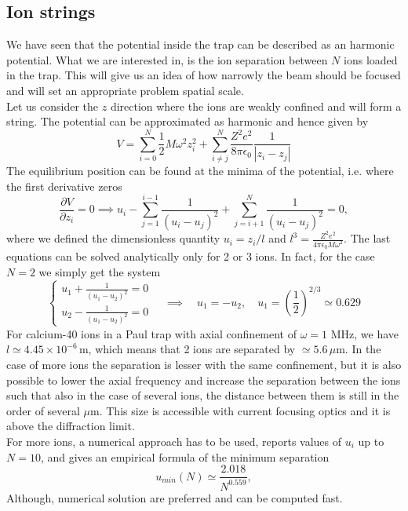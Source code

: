 \subsection{Ion strings}
We have seen that the potential inside the trap can be described as an harmonic potential. What we are interested in, is the ion separation between $N$ ions loaded in the trap. This will give us an idea of how narrowly the beam should be focused and will set an appropriate problem spatial scale.\\
Let us consider the $z$ direction where the ions are weakly confined and will form a string. The potential can be approximated as harmonic and hence given by
\begin{equation}
V = \sum_{i=0}^N \frac{1}{2}M\omega^2z_i^2 + \sum_{i\neq j}^N\frac{Z^2e^2}{8\pi \epsilon_0}\frac{1}{|z_i-z_j|}
\end{equation}
The equilibrium position can be found at the minima of the potential, i.e. where the first derivative zeros
\begin{equation}
\frac{\partial V}{\partial z_i} = 0 \implies u_i - \sum_{j=1}^{i-1} \frac{1}{(u_i-u_j)^2} + \sum_{j= i+1}^{N} \frac{1}{(u_i-u_j)^2}= 0,
\end{equation}
where we defined the dimensionless quantity $u_i = z_i/l$ and $l^3 = \displaystyle\frac{Z^2 e^2 }{4\pi \epsilon_0 M\omega^2}$.
The last equations can be solved analytically only for 2 or 3 ions. In fact, for the case $N=2$ we simply get the system
\begin{equation}
\begin{cases}
  u_1 + \frac{1}{(u_1-u_2)^2} = 0\\
  u_2 - \frac{1}{(u_1-u_2)^2} = 0
  \end{cases} \quad \implies \quad u_1 = -u_2,\quad  u_1 = \left(\frac{1}{2}\right)^{2/3} \simeq 0.629
\end{equation}
For calcium-40 ions in a Paul trap with axial confinement of $\omega = 1$ MHz, we have $l \simeq 4.45\times 10^{-6}\,$m, which means that 2 ions are separated by $\simeq 5.6\, \mu$m. In the case of more ions the separation is lesser with the same confinement, but it is also possible to lower the axial frequency and increase the separation between the ions such that also in the case of several ions, the distance between them is still in the order of several $\mu$m. This size is accessible with current focusing optics and it is above the diffraction limit.\\
For more ions, a numerical approach has to be used, \cite{ion_spacing} reports values of $u_i$ up to $N=10$, and gives an empirical formula of the minimum separation
\begin{equation}
u_{min}(N) \simeq \frac{2.018}{N^{0.559}},
\end{equation}
Although, numerical solution are preferred and can be computed fast.
